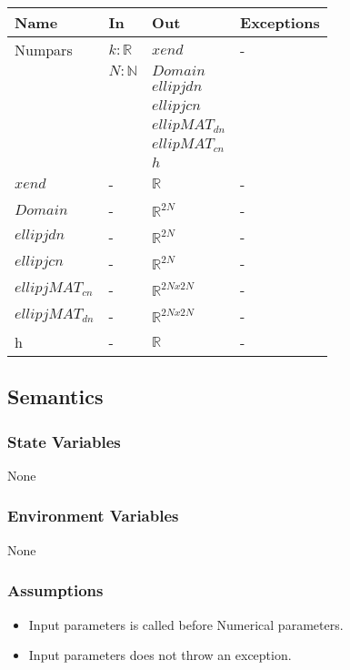 \documentclass[12pt, titlepage]{article}
\begin{document}
\begin{center}
	\begin{tabular}{p{3cm} p{3cm} p{7cm} >{\raggedright\arraybackslash}p{3cm}}
		\toprule
		\textbf{Name} & \textbf{In} & \textbf{Out} & \textbf{Exceptions} \\
		\hline
		Numpars & $k :\mathbb{R}$ & 
		$xend$ & - \\ 
		  &$N: \mathbb{N}$ & $Domain$ &  \\
		  &  & $ellipjdn$ &  \\ 
		  &  & $ellipjcn$ &  \\ 
		  &  & $ellipMAT_{dn}$ &  \\
		  &  & $ellipMAT_{cn}$ &  \\ 
		   &  & $h$ &  \\
		$xend$ & - & $\mathbb{R}$ & - \\
		$Domain$ & - & $\mathbb{R}^{2N}$ &- \\
		$ellipjdn$ & - & $\mathbb{R}^{2N}$ &- \\
		$ellipjcn$ & - & $\mathbb{R}^{2N}$ &- \\
		$ellipjMAT_{cn}$ & - & $\mathbb{R}^{2Nx2N}$ &- \\
		$ellipjMAT_{dn}$ & - & $\mathbb{R}^{2Nx2N}$ &- \\
		h & - & $\mathbb{R}$ & -\\ 
		\hline
	\end{tabular}
\end{center}

\subsection{Semantics}

\subsubsection{State Variables}
None

\subsubsection{Environment Variables}

None

\subsubsection{Assumptions}

\begin{itemize}
	\item Input parameters is called before Numerical parameters. 
	\item Input parameters does not throw an exception. 
\end{itemize}
\end{document}
